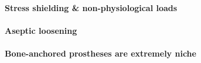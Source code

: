 \paragraph{Stress shielding \& non-physiological loads}

\paragraph{Aseptic loosening}

\paragraph{Bone-anchored prostheses are extremely niche}